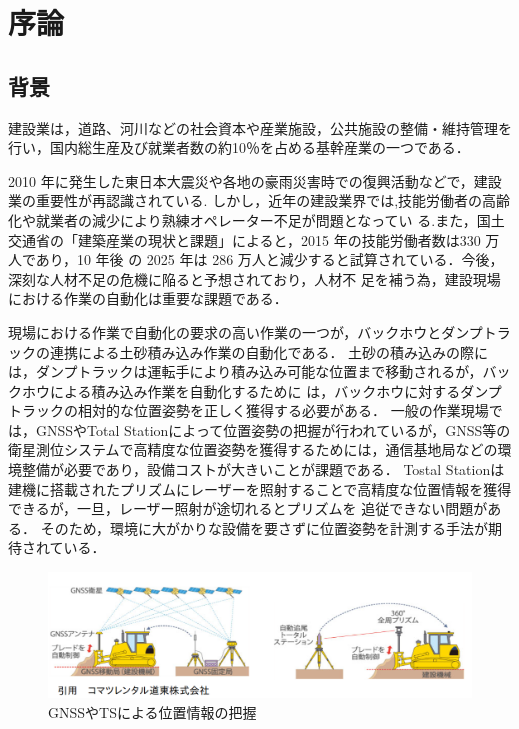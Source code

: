 \chapter{序論}
\thispagestyle{empty}
\label{Chap1}
\minitoc

\newpage

\section{背景}
\label{Background}
建設業は，道路、河川などの社会資本や産業施設，公共施設の整備・維持管理を行い，国内総生産及び就業者数の約10％を占める基幹産業の一つである．
\par 2010 年に発生した東日本大震災や各地の豪雨災害時での復興活動などで，建設業の重要性が再認識されている.
しかし，近年の建設業界では,技能労働者の高齢化や就業者の減少により熟練オペレーター不足が問題となってい
る.また，国土交通省の「建築産業の現状と課題」\cite{建設経済研究所2017}によると，2015 年の技能労働者数は330 万人であり，10 年後
の 2025 年は 286 万人と減少すると試算されている．今後，深刻な人材不足の危機に陥ると予想されており，人材不
足を補う為，建設現場における作業の自動化は重要な課題である．
\par
現場における作業で自動化の要求の高い作業の一つが，バックホウとダンプトラックの連携による土砂積み込み作業の自動化である．
土砂の積み込みの際には，ダンプトラックは運転手により積み込み可能な位置まで移動されるが，バックホウによる積み込み作業を自動化するために
は，バックホウに対するダンプトラックの相対的な位置姿勢を正しく獲得する必要がある．
一般の作業現場では，GNSSやTotal Stationによって位置姿勢の把握\cite{土井下2010}が行われているが，GNSS等の衛星測位システムで高精度な位置姿勢を獲得するためには，通信基地局などの環境整備が必要であり，設備コストが大きいことが課題である．
Tostal Stationは建機に搭載されたプリズムにレーザーを照射することで高精度な位置情報を獲得できるが，一旦，レーザー照射が途切れるとプリズムを
追従できない問題がある．
そのため，環境に大がかりな設備を要さずに位置姿勢を計測する手法が期待されている．

\begin{figure}[b]
 \begin{center}
 \includegraphics[width=1.0\columnwidth]{./chap1/fig/GNSS.png}
 \caption{GNSSやTSによる位置情報の把握}
 \label{fig:GNSS}
 \end{center}
\end{figure}

